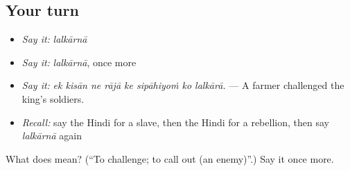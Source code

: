 \subsection*{Your turn}
\begin{itemize}
\raggedright
  \item \emph{Say it:} \emph{lalkārnā}
  \item \emph{Say it:} \emph{lalkārnā}, once more
  \item \emph{Say it:} \emph{ek kisān ne rājā ke sipāhiyoṁ ko lalkārā.} — A farmer challenged the king's soldiers.
  \item \emph{Recall:} say the Hindi for a slave, then the Hindi for a rebellion, then say \emph{lalkārnā} again
\end{itemize}

\begin{tcolorbox}[breakable,colback=teal!4,colframe=teal!35!black,title={Before you move on}]
What does  mean? (\textquotedblleft{}To challenge; to call out (an enemy)\textquotedblright{}.) Say it once more.
\end{tcolorbox}
